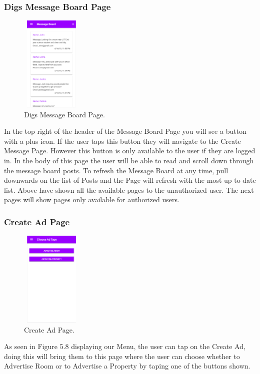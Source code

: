\subsubsection{Digs Message Board Page}

\begin{figure}[h]
\centering
\includegraphics[width=2.9cm, height=4.6cm]{img/MessageBoard}
\caption{Digs Message Board Page.}
\end{figure}

In the top right of the header of the Message Board Page you will see a button with a plus icon. If the user taps this button they will navigate to the Create Message Page. However this button is only available to the user if they are logged in. In the body of this page the user will be able to read and scroll down through the message board posts. To refresh the Message Board at any time, pull downwards on the list of Posts and the Page will refresh with the most up to date list.
Above have shown all the available pages to the unauthorized user. The next pages will show pages only available for authorized users.

\subsubsection{Create Ad Page}

\begin{figure}[h]
\centering
\includegraphics[width=2.9cm, height=4.6cm]{img/CreateAd}
\caption{Create Ad Page.}
\end{figure}

As seen in Figure 5.8 displaying our Menu, the user can tap on the Create Ad, doing this will bring them to this page where the user can choose whether to Advertise Room or to Advertise a Property by taping one of the buttons shown.

